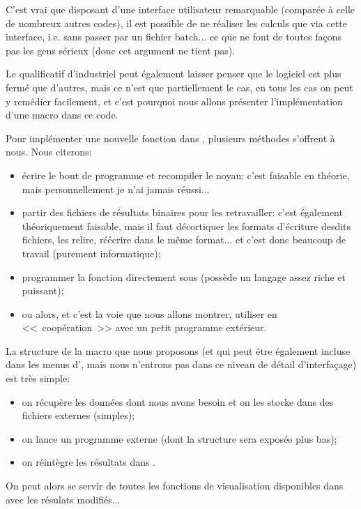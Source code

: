 C'est vrai que disposant d'une interface utilisateur remarquable (comparée à celle de nombreux autres codes),
il est possible de ne réaliser les calculs que via cette interface, i.e. sans passer par un fichier batch... ce que ne
font de toutes façons pas les gens sérieux (donc cet argument ne tient pas).

Le qualificatif d'industriel peut également laisser penser que le logiciel est plus fermé que d'autres, mais ce
n'est que partiellement le cas, en tous les cas on peut y remédier facilement, et c'est pourquoi nous allons
présenter l'implémentation d'une macro dans ce code.

\medskip
Pour implémenter une nouvelle fonction dans \ansys, plusieurs méthodes s'offrent à nous. Nous citerons:
\begin{itemize}
  \item écrire le bout de programme et recompiler le noyau: c'est faisable en théorie, mais personnellement je n'ai
	jamais réussi...
  \item partir des fichiers de résultats binaires pour les retravailler: c'est également théoriquement faisable, mais
	il faut décortiquer les formats d'écriture desdits fichiers, les relire, réécrire dans le même format...
	et c'est donc beaucoup de travail (purement informatique);
  \item programmer la fonction directement sous \ansys (\ansys possède un langage assez riche et puissant);
  \item ou alors, et c'est la voie que nous allons montrer, utiliser \ansys en <<~coopération~>> avec un
	petit programme extérieur.
\end{itemize}

\medskip
La structure de la macro \ansys que nous proposons (et qui peut être également incluse dans les menus d'\ansys, mais
nous n'entrons pas dans ce niveau de détail d'interfaçage) est très simple:
\begin{itemize}
  \item on récupère les données dont nous avons besoin et on les stocke dans des fichiers externes (simples);
  \item on lance un programme externe (dont la structure sera exposée plus bas);
  \item on réintègre les résultats dans \ansys.
\end{itemize}
On peut alors se servir de toutes les fonctions de visualisation disponibles dans \ansys avec les résulats modifiés...

